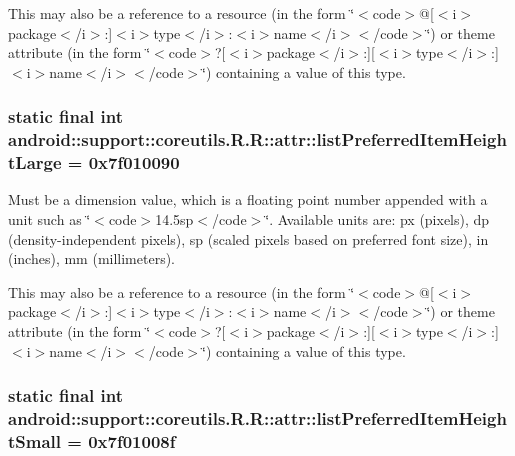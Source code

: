 This may also be a reference to a resource (in the form \char`\"{}$<$code$>$@\mbox{[}$<$i$>$package$<$/i$>$:\mbox{]}$<$i$>$type$<$/i$>$:$<$i$>$name$<$/i$>$$<$/code$>$\char`\"{}) or theme attribute (in the form \char`\"{}$<$code$>$?\mbox{[}$<$i$>$package$<$/i$>$:\mbox{]}\mbox{[}$<$i$>$type$<$/i$>$:\mbox{]}$<$i$>$name$<$/i$>$$<$/code$>$\char`\"{}) containing a value of this type. \hypertarget{classandroid_1_1support_1_1coreutils_1_1_r_1_1attr_41278817267eb5b22028a2c55e9ebd03}{
\subsubsection[{listPreferredItemHeightLarge}]{\setlength{\rightskip}{0pt plus 5cm}static final int android::support::coreutils.R.R::attr::listPreferredItemHeightLarge = 0x7f010090}}
\label{classandroid_1_1support_1_1coreutils_1_1_r_1_1attr_41278817267eb5b22028a2c55e9ebd03}


Must be a dimension value, which is a floating point number appended with a unit such as \char`\"{}$<$code$>$14.5sp$<$/code$>$\char`\"{}. Available units are: px (pixels), dp (density-independent pixels), sp (scaled pixels based on preferred font size), in (inches), mm (millimeters). 

This may also be a reference to a resource (in the form \char`\"{}$<$code$>$@\mbox{[}$<$i$>$package$<$/i$>$:\mbox{]}$<$i$>$type$<$/i$>$:$<$i$>$name$<$/i$>$$<$/code$>$\char`\"{}) or theme attribute (in the form \char`\"{}$<$code$>$?\mbox{[}$<$i$>$package$<$/i$>$:\mbox{]}\mbox{[}$<$i$>$type$<$/i$>$:\mbox{]}$<$i$>$name$<$/i$>$$<$/code$>$\char`\"{}) containing a value of this type. \hypertarget{classandroid_1_1support_1_1coreutils_1_1_r_1_1attr_9a8b734e2208dde3eec100d36e402cdf}{
\subsubsection[{listPreferredItemHeightSmall}]{\setlength{\rightskip}{0pt plus 5cm}static final int android::support::coreutils.R.R::attr::listPreferredItemHeightSmall = 0x7f01008f}}
\label{classandroid_1_1support_1_1coreutils_1_1_r_1_1attr_9a8b734e2208dde3eec100d36e402cdf}



